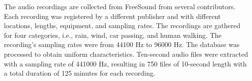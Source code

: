  The audio recordings are collected from FreeSound \cite{10.1145/2502081.2502245} from several contributors. Each recording was registered by a different publisher and with different locations, lengths, equipment, and sampling rates. The recordings are gathered for four categories, i.e., rain, wind, car passing, and human walking. The recording's sampling rates were from 44100 Hz to 96000 Hz. The database was processed to obtain uniform characteristics. Ten-second audio files were extracted with a sampling rate of 441000 Hz, resulting in 750 files of 10-second length with a total duration of 125 minutes for each recording\cite{ahmed2021sound}.
 
